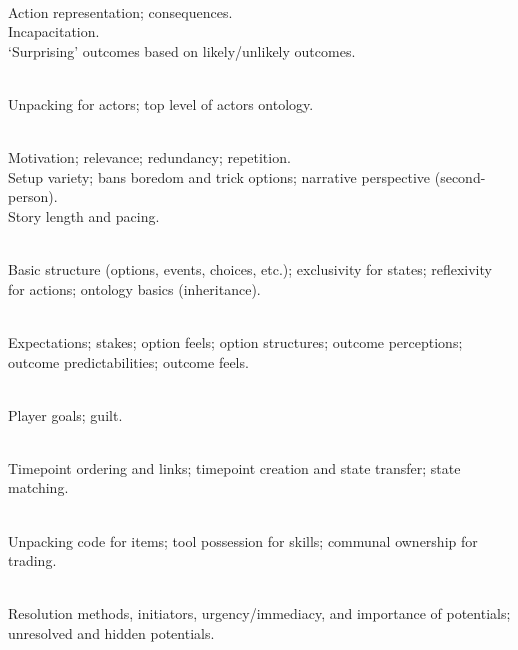 \begin{table}[!p]
\begin{minipage}[t][0.935\textheight]{\dimexpr0.5\textwidth-1.2em}
\begin{hangparas}{0.8em}{1}
\setlength{\parskip}{0.5em}
 \\
  \cg{[representational]} Action representation; consequences. \\
  \cg{[constituent]} Incapacitation. \\
  \cg{[poetic]} `Surprising' outcomes based on likely/unlikely outcomes.

 \\
  \cg{[representatonal]} Unpacking for actors; top level of actors ontology.

 \\
  \cg{[constituent]} Motivation; relevance; redundancy; repetition.  \\
  \cg{[aesthetic]} Setup variety; bans boredom and trick options; narrative perspective (second-person). \\
  \cg{[poetic]} Story length and pacing.

   \\
  \cg{[representational]} Basic structure (options, events, choices, etc.); exclusivity for states; reflexivity for actions; ontology basics (inheritance).

   \\
  \cg{[poetic]} Expectations; stakes; option feels; option structures; outcome perceptions; outcome predictabilities; outcome feels.

   \\
  \cg{[poetic]} Player goals; guilt.

   \\
  \cg{[representational]} Timepoint ordering and links; timepoint creation and state transfer; state matching.

   \\
  \cg{[representational]} Unpacking code for items; tool possession for skills; communal ownership for trading.
\end{hangparas}%
\end{minipage}%
\hfill
\noindent
\begin{minipage}[t][0.935\textheight]{\dimexpr0.5\textwidth-1.2em}
\begin{hangparas}{0.8em}{1}
\setlength{\parskip}{0.5em}
   \\
  \cg{[representational]} Resolution methods, initiators, urgency/immediacy, and importance of potentials; unresolved and hidden potentials.


\end{hangparas}
\end{minipage}
\end{table}
